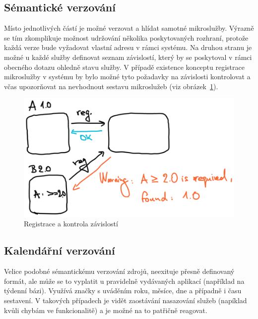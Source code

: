 \subsection{Sémantické verzování }\label{subsec:msa-dependencies-msa}
Místo jednotlivých částí  je možné verzovat a hlídat samotné mikroslužby.
Výrazně se tím zkomplikuje možnost udržování několika poskytovaných rozhraní, protože každá verze bude vyžadovat vlastní adresu v rámci systému.
Na druhou stranu je možné u každé služby definovat seznam závislostí, který by se poskytoval v rámci obecného dotazu ohledně stavu služby.
V případě existence konceptu registrace mikroslužby v systému by bylo možné tyto požadavky na závislosti kontrolovat a včas upozorňovat na nevhodnout sestavu mikroslužeb (viz obrázek~\ref{fig:version-reg}).

\begin{figure}[htbp]
   \centering
   \includegraphics[max width=\textwidth]{assets/draft-version-reg}
   \caption{Registrace  a kontrola závislostí}\label{fig:version-reg}
\end{figure}



\subsection{Kalendářní verzování }\label{subsec:msa-dependencies-calendar}

Velice podobné sémantickému verzování zdrojů, neexituje přesně definovaný formát, ale může se to vyplatit u pravidelně vydávaných aplikací (například na týdenní bázi).
Využívá značky s uváděním roku, měsíce, dne a případně i času sestavení.
V takových případech je vidět zaostávání nasazování služeb (napíklad kvůli chybám ve funkcionalitě) a je možné na to patřičně reagovat.~\cite{msversions}

\newpage
